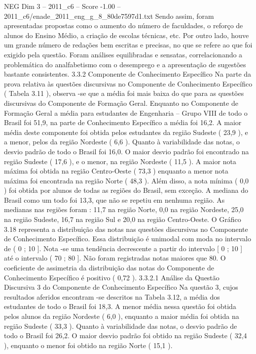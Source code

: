 \begin{textsample}{NEG Dim 3 – 2011\_c6 – Score -1.00 – 2011\_c6/enade\_2011\_eng\_g\_8\_80de7597d1.txt}
Sendo assim, foram apresentadas propostas como o aumento do número de faculdades, o reforço de alunos do Ensino Médio, a criação de escolas técnicas, etc.
Por outro lado, houve um grande número de redações bem escritas e precisas, no que se refere ao que foi exigido pela questão.
Foram análises equilibradas e sensatas, correlacionando a problemática do analfabetismo com o desemprego e a apresentação de sugestões bastante consistentes. 3.3.2 Componente de Conhecimento Específico Na parte da prova relativa às questões discursivas no Componente de Conhecimento Específico ( Tabela 3.11 ), observa -se que a média foi mais baixa do que para as questões discursivas do Componente de Formação Geral.
Enquanto no Componente de Formação Geral a média para estudantes de Engenharia – Grupo VIII de todo o Brasil foi 51,9, na parte de Conhecimento Específico a média foi 16,2.
A maior média deste componente foi obtida pelos estudantes da região Sudeste ( 23,9 ), e a menor, pelos da região Nordeste ( 6,6 ).
Quanto à variabilidade das notas, o desvio padrão de todo o Brasil foi 16,0.
O maior desvio padrão foi encontrado na região Sudeste ( 17,6 ), e o menor, na região Nordeste ( 11,5 ).
A maior nota máxima foi obtida na região Centro-Oeste ( 73,3 ) enquanto a menor nota máxima foi encontrada na região Norte ( 48,3 ).
Além disso, a nota mínima ( 0,0 ) foi obtida por alunos de todas as regiões do Brasil, sem exceção.
A mediana do Brasil como um todo foi 13,3, que não se repetiu em nenhuma região.
As medianas nas regiões foram : 11,7 na região Norte, 0,0 na região Nordeste, 25,0 na região Sudeste, 16,7 na região Sul e 20,0 na região Centro-Oeste.
O Gráfico 3.18 representa a distribuição das notas nas questões discursivas no Componente de Conhecimento Específico.
Essa distribuição é unimodal com moda no intervalo de ( 0 ; 10 ].
Nota -se uma tendência decrescente a partir do intervalo [ 0 ; 10 ] até o intervalo ( 70 ; 80 ].
Não foram registradas notas maiores que 80.
O coeficiente de assimetria da distribuição das notas do Componente de Conhecimento Específico é positivo ( 0,72 ). 3.3.2.1 Análise da Questão Discursiva 3 do Componente de Conhecimento Específico Na questão 3, cujos resultados aferidos encontram -se descritos na Tabela 3.12, a média dos estudantes de todo o Brasil foi 18,3.
A menor média nessa questão foi obtida pelos alunos da região Nordeste ( 6,0 ), enquanto a maior média foi obtida na região Sudeste ( 33,3 ).
Quanto à variabilidade das notas, o desvio padrão de todo o Brasil foi 26,2.
O maior desvio padrão foi obtido na região Sudeste ( 32,4 ), enquanto o menor foi obtido na região Norte ( 15,1 ).

\end{textsample}
